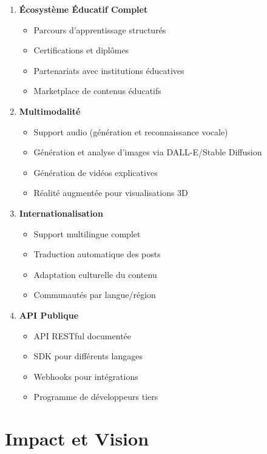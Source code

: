 \begin{enumerate}
    \item \textbf{Écosystème Éducatif Complet}
    \begin{itemize}
        \item Parcours d'apprentissage structurés
        \item Certifications et diplômes
        \item Partenariats avec institutions éducatives
        \item Marketplace de contenus éducatifs
    \end{itemize}
    
    \item \textbf{Multimodalité}
    \begin{itemize}
        \item Support audio (génération et reconnaissance vocale)
        \item Génération et analyse d'images via DALL-E/Stable Diffusion
        \item Génération de vidéos explicatives
        \item Réalité augmentée pour visualisations 3D
    \end{itemize}
    
    \item \textbf{Internationalisation}
    \begin{itemize}
        \item Support multilingue complet
        \item Traduction automatique des posts
        \item Adaptation culturelle du contenu
        \item Communautés par langue/région
    \end{itemize}
    
    \item \textbf{API Publique}
    \begin{itemize}
        \item API RESTful documentée
        \item SDK pour différents langages
        \item Webhooks pour intégrations
        \item Programme de développeurs tiers
    \end{itemize}
\end{enumerate}

\section*{Impact et Vision}

